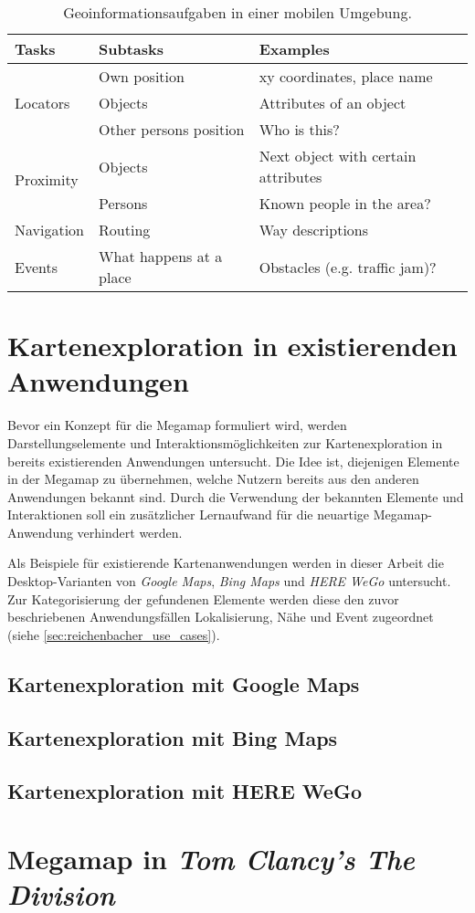 \begin{table}[tbh]
    \centering
    \caption{Geoinformationsaufgaben in einer mobilen Umgebung. }
    \label{tab:gis_user_tasks}
    \begin{tabular}{@{}lll@{}}\toprule
        \textsf{\textbf{Tasks}} & \textsf{\textbf{Subtasks}} & \textsf{\textbf{Examples}}\\ \midrule
        \multirow{3}{*}{Locators} & Own position & xy coordinates, place name \\
                                  & Objects & Attributes of an object\\
                                  & Other persons position & Who is this?\\ \midrule
        \multirow{2}{*}{Proximity} & Objects & Next object with certain attributes\\
                                   & Persons & Known people in the area?\\ \midrule
        Navigation & Routing & Way descriptions\\ \midrule
        Events & What happens at a place & Obstacles (e.g. traffic jam)?\\ \bottomrule
    \end{tabular}
    \vspace{0.5em}
\end{table}

\section{Kartenexploration in existierenden Anwendungen}
Bevor ein Konzept für die Megamap formuliert wird, werden Darstellungselemente und Interaktionsmöglichkeiten zur Kartenexploration in bereits existierenden Anwendungen untersucht.
Die Idee ist, diejenigen Elemente in der Megamap zu übernehmen, welche Nutzern bereits aus den anderen Anwendungen bekannt sind.
Durch die Verwendung der bekannten Elemente und Interaktionen soll ein zusätzlicher Lernaufwand für die neuartige Megamap-Anwendung verhindert werden.

Als Beispiele für existierende Kartenanwendungen werden in dieser Arbeit die Desktop-Varianten von \emph{Google Maps}, \emph{Bing Maps} \parencite{Microsoft2018b} und \emph{HERE WeGo} \parencite{HERE2018} untersucht.
Zur Kategorisierung der gefundenen Elemente werden diese den zuvor beschriebenen Anwendungsfällen Lokalisierung, Nähe und Event zugeordnet (siehe \autoref{sec:reichenbacher_use_cases}).

\subsection{Kartenexploration mit Google Maps}
\subsection{Kartenexploration mit Bing Maps}
\subsection{Kartenexploration mit HERE WeGo}

\section{Megamap in \emph{Tom Clancy's The Division}}

%
\cleardoublepage
